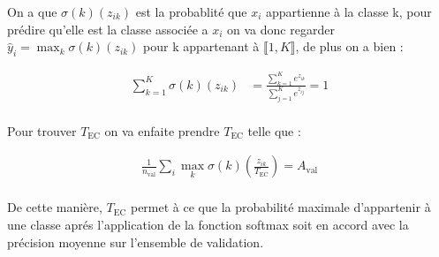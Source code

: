 \documentclass{article}
\begin{document}
On a que $\sigma(k)(z_{ik})$ est la probablité que $x_i$ appartienne à la classe k, pour prédire qu'elle est la classe associée a $x_i$ on va donc regarder $\hat{y}_i=\max_{k}\sigma(k)(z_{ik})$ pour k appartenant à \(\llbracket 1, K \rrbracket\), de plus on a bien :

\begin{align*}
\sum_{k=1}^{K} \sigma(k) (z_{ik}) &= \frac{\sum_{k=1}^{K} e^{z_{ik}}}{\sum_{j=1}^{K} e^{z_{ij}}} = 1 \\
\end{align*}

Pour trouver $T_{\text{EC}}$ on va enfaite prendre $T_{\text{EC}}$ telle que :

\begin{align*}
\frac{1}{n_{\text{val}}} \sum_{i} \max_{k}\sigma(k) \left(\frac{z_{ik}}{T_{\text{EC}}}\right) = A_{\text{val}}\\
\end{align*}

De cette manière, $T_{\text{EC}}$ permet à ce que la probabilité maximale d'appartenir à une classe aprés l'application de la fonction softmax soit en accord avec la précision moyenne sur l’ensemble de validation.
\end{document}
